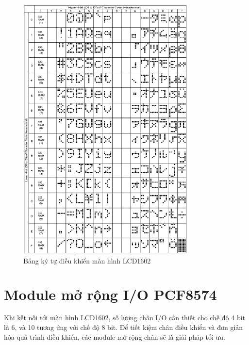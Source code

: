 \begin{figure}[H]
    \centering
    \includegraphics[width=0.8\textwidth]{images/Asciichart.png}
    \caption{Bảng ký tự điều khiển màn hình LCD1602}
    \label{fig:hd44780-char}
\end{figure}

\section{Module mở rộng I/O PCF8574}
\paragraph{}
Khi kết nối tới màn hình LCD1602, số lượng chân I/O cần thiết cho chế độ 4 bit là 6, và 10 tương ứng với chế độ 8 bit. Để tiết kiệm chân điều khiển và đơn giản hóa quá trình điều khiển, các module mở rộng chân sẽ là giải pháp tối ưu.
